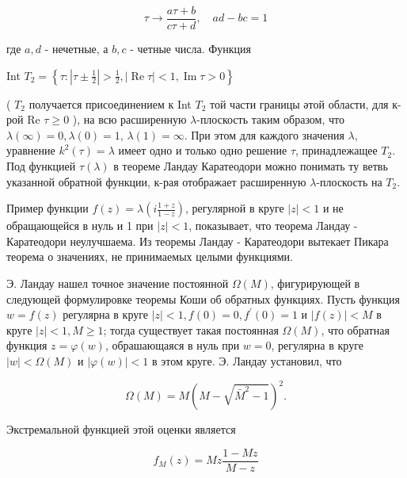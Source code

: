 \documentclass[10pt]{article}
\begin{document}
\[

\tau \longrightarrow \frac{a \tau+b}{c \tau+d}, \quad a d-b c=1

\]



где $a, d$ - нечетные, а $b, c$ - четные числа. Функция



Int $T_{2}=\left\{\tau:\left|\tau \pm \frac{1}{2}\right|>\frac{1}{2},|\operatorname{Re} \tau|<1, \operatorname{Im} \tau>0\right\}$



( $T_{2}$ получается присоединением к Int $T_{2}$ той части границы әтой области, для к-рой Re $\tau \geqslant 0$ ), на всю расширенную $\lambda$-плоскость таким образом, что $\lambda(\infty)=0, \lambda(0)=1$, $\lambda(1)=\infty$. При этом для каждого значения $\lambda$, уравнение $k^{2}(\tau)=\lambda$ имеет одно и только одно решение $\tau$, принадлежащее $T_{2}$. Под функцией $\tau(\lambda)$ в теореме Ландау Каратеодори можно понимать ту ветвь указанной обратной функции, к-рая отображает расширенную $\lambda$-плоскость на $T_{2}$.



Пример функции $f(z)=\lambda\left(i \frac{1+z}{1-z}\right)$, регулярной в круге $|z|<1$ и не обращающейся в нуль и 1 при $|z|<1$, показывает, что теорема Ландау - Каратеодори неулучшаема. Из теоремы Ландау - Каратеодори вытекает Пикара теорема о значениях, не принимаемых целыми функциями.



Э. Ландау нашел точное значение постоянной $\Omega(M)$, фигурирующей в следующей формулировке теоремы Коши об обратных функциях. Пусть функция $w=f(z)$ регулярна в круге $|z|<1, f(0)=0, f^{\prime}(0)=1$ и $|f(z)|<M$ в круге $|z|<1, M \geqslant 1$; тогда существует такая постоянная $\Omega(M)$, что обратная функция $z=\varphi(w)$, обрашающаяся в нуль при $w=0$, регулярна в круге $|w|<\Omega(M)$ и $|\varphi(w)|<1$ в этом круге. Э. Ландау установил, что



\[

\Omega(M)=M\left(M-\sqrt{\bar{M}^{2}-1}\right)^{2} .

\]



Экстремальной функцией этой оценки является



\[

f_{M}(z)=M z \frac{1-M z}{M-z}

\]
\end{document}

